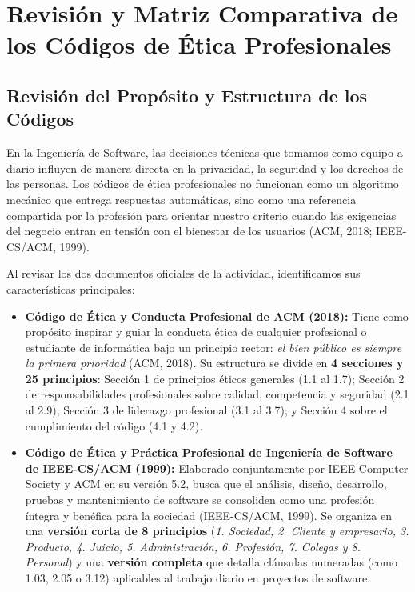 \documentclass[12pt,a4paper,oneside]{article}
\begin{document}
\setcounter{page}{1}
\tableofcontents
\clearpage
{}

\section{Revisión y Matriz Comparativa de los Códigos de Ética Profesionales}

\subsection{Revisión del Propósito y Estructura de los Códigos}
En la Ingeniería de Software, las decisiones técnicas que tomamos como equipo a diario influyen de manera directa en la privacidad, la seguridad y los derechos de las personas. Los códigos de ética profesionales no funcionan como un algoritmo mecánico que entrega respuestas automáticas, sino como una referencia compartida por la profesión para orientar nuestro criterio cuando las exigencias del negocio entran en tensión con el bienestar de los usuarios (ACM, 2018; IEEE-CS/ACM, 1999).

Al revisar los dos documentos oficiales de la actividad, identificamos sus características principales:
\begin{itemize}[leftmargin=1.8em,itemsep=3pt]
    \item \textbf{Código de Ética y Conducta Profesional de ACM (2018):} Tiene como propósito inspirar y guiar la conducta ética de cualquier profesional o estudiante de informática bajo un principio rector: \textit{el bien público es siempre la primera prioridad} (ACM, 2018). Su estructura se divide en \textbf{4 secciones y 25 principios}: Sección 1 de principios éticos generales (1.1 al 1.7); Sección 2 de responsabilidades profesionales sobre calidad, competencia y seguridad (2.1 al 2.9); Sección 3 de liderazgo profesional (3.1 al 3.7); y Sección 4 sobre el cumplimiento del código (4.1 y 4.2).
    \item \textbf{Código de Ética y Práctica Profesional de Ingeniería de Software de IEEE-CS/ACM (1999):} Elaborado conjuntamente por IEEE Computer Society y ACM en su versión 5.2, busca que el análisis, diseño, desarrollo, pruebas y mantenimiento de software se consoliden como una profesión íntegra y benéfica para la sociedad (IEEE-CS/ACM, 1999). Se organiza en una \textbf{versión corta de 8 principios} (\textit{1. Sociedad, 2. Cliente y empresario, 3. Producto, 4. Juicio, 5. Administración, 6. Profesión, 7. Colegas y 8. Personal}) y una \textbf{versión completa} que detalla cláusulas numeradas (como 1.03, 2.05 o 3.12) aplicables al trabajo diario en proyectos de software.
\end{itemize}
\end{document}
